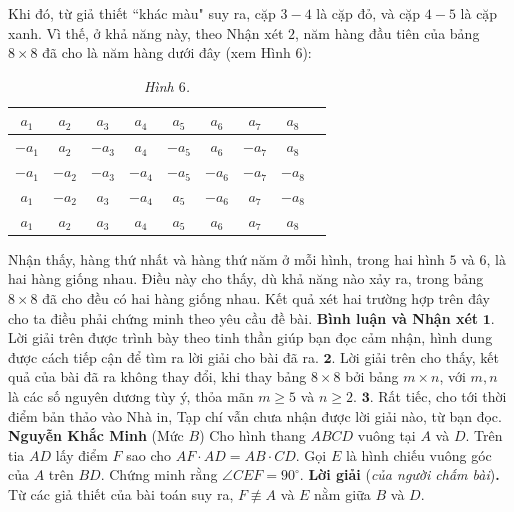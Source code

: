 \begin{multicols}{2}
	\vskip 0.05cm
	Khi đó, từ giả thiết ``khác màu" suy ra, cặp $3 - 4$ là cặp đỏ, và cặp $4 - 5$ là cặp xanh.
	\vskip 0.05cm
	Vì thế, ở khả năng này, theo Nhận xét $2$, năm hàng đầu tiên của bảng $8 \times  8$ đã cho là năm hàng dưới đây (xem Hình $6$):
	\begin{table}[H]
		\vspace*{-10pt}
		\centering
		\captionsetup{labelformat= empty, justification=centering}
		\renewcommand{\arraystretch}{1.2}
		\setlength{\tabcolsep}{2pt}
		\begin{tabular}{|c|c|c|c|c|c|c|c|c|}
			\hline
			$a_1$ & $a_2$ & $a_3$ & $a_4$ & $a_5$ & $a_6$ & $a_7$ & $a_8$ \\
			\hline
			$-a_1$ & $a_2$ & $-a_3$ & $a_4$ & $-a_5$ & $a_6$ & $-a_7$ & $a_8$ \\
			\hline
			$-a_1$ & $-a_2$ & $-a_3$ & $-a_4$ & $-a_5$ & $-a_6$ & $-a_7$ & $-a_8$ \\
			\hline
			$a_1$ & $-a_2$ & $a_3$ & $-a_4$ & $a_5$ & $-a_6$ & $a_7$ & $-a_8$ \\
			\hline
			$a_1$ & $a_2$ & $a_3$ & $a_4$ & $a_5$ & $a_6$ & $a_7$ & $a_8$ \\
			\hline
		\end{tabular}
		\caption{\small\textit{\color{thachthuctoanhoc}Hình $6$.}}
		\vspace*{-15pt}
	\end{table}
	Nhận thấy, hàng thứ nhất và hàng thứ năm ở mỗi hình, trong hai hình $5$ và $6$, là hai hàng giống nhau. Điều này cho thấy, dù khả năng nào xảy ra, trong bảng $8 \times  8$ đã cho đều có hai hàng giống nhau.
	\vskip 0.05cm
	Kết quả xét hai trường hợp trên đây cho ta điều phải chứng minh theo yêu cầu đề bài.
	\vskip 0.05cm
	\textbf{\color{thachthuctoanhoc}Bình luận và Nhận xét}
	\vskip 0.05cm
	$\pmb{1.}$ Lời giải trên được trình bày theo tinh thần giúp bạn đọc cảm nhận, hình dung được cách tiếp cận để tìm ra lời giải cho bài đã ra.
	\vskip 0.05cm
	$\pmb{2.}$ Lời giải trên cho thấy, kết quả của bài đã ra không thay đổi, khi thay bảng $8 \times  8$ bởi bảng $m \times  n$, với $m, n$ là các số nguyên dương tùy ý, thỏa mãn $m \ge  5$ và $n \ge  2$.
	\vskip 0.05cm
	$\pmb{3.}$ Rất tiếc, cho tới thời điểm bản thảo vào Nhà in, Tạp chí vẫn chưa nhận được lời giải nào, từ bạn đọc.
	\vskip 0.05cm
		\hfill\textbf{\color{thachthuctoanhoc}Nguyễn Khắc Minh}
	\vskip 0.05cm
	{}
	(Mức $B$) Cho hình thang $ABCD$ vuông tại $A$ và $D$. Trên tia $AD$ lấy điểm $F$ sao cho $AF\cdot AD=AB\cdot CD$. Gọi $E$ là hình chiếu vuông góc của $A$ trên $BD$. Chứng minh rằng $\angle CEF=90^\circ$. 
	\vskip 0.05cm
	\textbf{\color{thachthuctoanhoc}Lời giải} (\textit{của người chấm bài})\textbf{\color{thachthuctoanhoc}.}
	\vskip 0.05cm
	Từ các giả thiết của bài toán suy ra, $F \not\equiv A$  và $E$ nằm giữa $B$ và $D$.
	

\end{multicols}
